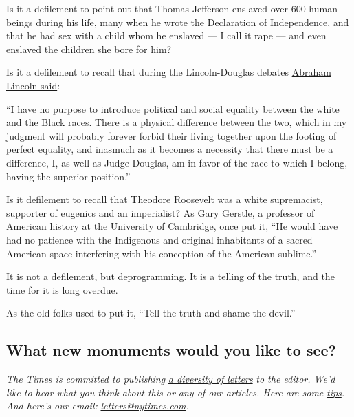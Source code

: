 Is it a defilement to point out that Thomas Jefferson enslaved over 600
human beings during his life, many when he wrote the Declaration of
Independence, and that he had sex with a child whom he enslaved --- I
call it rape --- and even enslaved the children she bore for him?

Is it a defilement to recall that during the Lincoln-Douglas debates
\href{https://www.stjoe.k12.in.us/ourpages/auto/2011/11/14/53458274/Lincoln-Douglas\%20Debates_\%20Excerpts.pdf}{Abraham
Lincoln said}:

``I have no purpose to introduce political and social equality between
the white and the Black races. There is a physical difference between
the two, which in my judgment will probably forever forbid their living
together upon the footing of perfect equality, and inasmuch as it
becomes a necessity that there must be a difference, I, as well as Judge
Douglas, am in favor of the race to which I belong, having the superior
position.''

Is it defilement to recall that Theodore Roosevelt was a white
supremacist, supporter of eugenics and an imperialist? As Gary Gerstle,
a professor of American history at the University of Cambridge,
\href{https://www.wbur.org/hereandnow/2019/03/21/teddy-roosevelt-legacy-100-years}{once
put it}, ``He would have had no patience with the Indigenous and
original inhabitants of a sacred American space interfering with his
conception of the American sublime.''

It is not a defilement, but deprogramming. It is a telling of the truth,
and the time for it is long overdue.

As the old folks used to put it, ``Tell the truth and shame the devil.''

\hypertarget{what-new-monuments-would-you-like-to-see}{%
\subsection{What new monuments would you like to
see?}\label{what-new-monuments-would-you-like-to-see}}

\emph{The Times is committed to publishing}
\href{https://www.nytimes.com/2019/01/31/opinion/letters/letters-to-editor-new-york-times-women.html}{\emph{a
diversity of letters}} \emph{to the editor. We'd like to hear what you
think about this or any of our articles. Here are some}
\href{https://help.nytimes.com/hc/en-us/articles/115014925288-How-to-submit-a-letter-to-the-editor}{\emph{tips}}\emph{.
And here's our email:}
\href{mailto:letters@nytimes.com}{\emph{letters@nytimes.com}}\emph{.}

